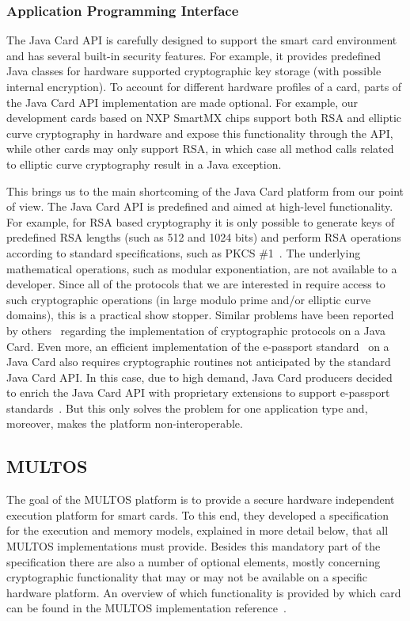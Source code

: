 \subsubsection{Application Programming Interface}

The Java Card API is carefully designed to support the smart card environment
and has several built-in security features. For example, it provides predefined
Java classes for hardware supported cryptographic key storage (with possible
internal encryption). To account for different hardware profiles of a card,
parts of the Java Card API implementation are made optional. For example, our
development cards based on NXP SmartMX chips support both RSA and elliptic curve
cryptography in hardware and expose this functionality through the API, while
other cards may only support RSA, in which case all method calls related to
elliptic curve cryptography result in a Java exception.

This brings us to the main shortcoming of the Java Card platform from our point
of view. The Java Card API is predefined and aimed at high-level functionality.
For example, for RSA based cryptography it is only possible to generate keys of
predefined RSA lengths (such as 512 and 1024 bits) and perform RSA operations
according to standard specifications, such as PKCS \#1~\cite{PKCS_1}. The
underlying mathematical operations, such as modular exponentiation, are not
available to a developer. Since all of the protocols that we are interested in
require access to such cryptographic operations (in large modulo prime and/or
elliptic curve domains), this is a practical show stopper. Similar problems have
been reported by others~\cite{Sterckx09} regarding the implementation of
cryptographic protocols on a Java Card. Even more, an efficient implementation
of the e-passport standard~\cite{EAC20} on a Java Card also requires
cryptographic routines not anticipated by the standard Java Card API. In this
case, due to high demand, Java Card producers decided to enrich the Java Card
API with proprietary extensions to support e-passport standards~\cite{NXP09}.
But this only solves the problem for one application type and, moreover, makes
the platform non-interoperable.

\subsection{MULTOS}\label{sec:multos}

The goal of the MULTOS platform is to provide a secure hardware independent
execution platform for smart cards. To this end, they developed a specification
for the execution and memory models, explained in more detail below, that all
MULTOS implementations must provide. Besides this mandatory part of the
specification there are also a number of optional elements, mostly concerning
cryptographic functionality that may or may not be available on a specific
hardware platform. An overview of which functionality is provided by which card
can be found in the MULTOS implementation reference~\cite{MIR2012}.

